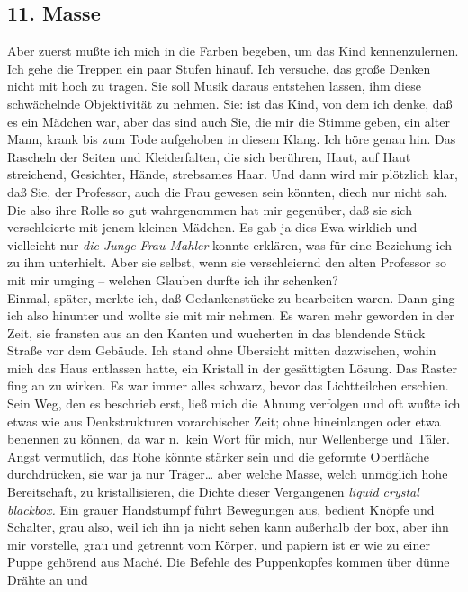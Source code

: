\documentclass[
]{article}
\author{}
\date{\vspace{-2.5em}}
\begin{document}
\subsection{11. Masse}\label{masse}

Aber zuerst mußte ich mich in die Farben begeben, um das Kind
kennenzulernen. Ich gehe die Treppen ein paar Stufen hinauf. Ich
versuche, das große Denken nicht mit hoch zu tragen. Sie soll Musik
daraus entstehen lassen, ihm diese schwächelnde Objektivität zu nehmen.
Sie: ist das Kind, von dem ich denke, daß es ein Mädchen war, aber das
sind auch Sie, die mir die Stimme geben, ein alter Mann, krank bis zum
Tode aufgehoben in diesem Klang. Ich höre genau hin. Das Rascheln der
Seiten und Kleiderfalten, die sich berühren, Haut, auf Haut streichend,
Gesichter, Hände, strebsames Haar. Und dann wird mir plötzlich klar, daß
Sie, der Professor, auch die Frau gewesen sein könnten, diech nur nicht
sah. Die also ihre Rolle so gut wahrgenommen hat mir gegenüber, daß sie
sich verschleierte mit jenem kleinen Mädchen. Es gab ja dies Ewa
wirklich und vielleicht nur \emph{die Junge Frau Mahler} konnte
erklären, was für eine Beziehung ich zu ihm unterhielt. Aber sie selbst,
wenn sie verschleiernd den alten Professor so mit mir umging -- welchen
Glauben durfte ich ihr schenken?\\
Einmal, später, merkte ich, daß Gedankenstücke zu bearbeiten waren. Dann
ging ich also hinunter und wollte sie mit mir nehmen. Es waren mehr
geworden in der Zeit, sie fransten aus an den Kanten und wucherten in
das blendende Stück Straße vor dem Gebäude. Ich stand ohne Übersicht
mitten dazwischen, wohin mich das Haus entlassen hatte, ein Kristall in
der gesättigten Lösung. Das Raster fing an zu wirken. Es war immer alles
schwarz, bevor das Lichtteilchen erschien. Sein Weg, den es beschrieb
erst, ließ mich die Ahnung verfolgen und oft wußte ich etwas wie aus
Denkstrukturen vorarchischer Zeit; ohne hineinlangen oder etwa benennen
zu können, da war n.~kein Wort für mich, nur Wellenberge und Täler.
Angst vermutlich, das Rohe könnte stärker sein und die geformte
Oberfläche durchdrücken, sie war ja nur Träger\ldots{} aber welche
Masse, welch unmöglich hohe Bereitschaft, zu kristallisieren, die Dichte
dieser Vergangenen \emph{liquid crystal blackbox. }Ein grauer Handstumpf
führt Bewegungen aus, bedient Knöpfe und Schalter, grau also, weil ich
ihn ja nicht sehen kann außerhalb der box, aber ihn mir vorstelle, grau
und getrennt vom Körper, und papiern ist er wie zu einer Puppe gehörend
aus Maché. Die Befehle des Puppenkopfes kommen über dünne Drähte an und
\end{document}
